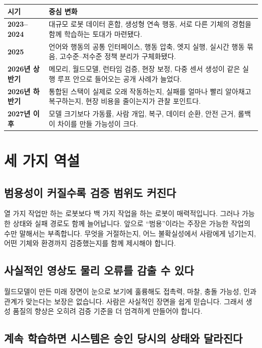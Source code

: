 \documentclass[11pt,openany]{book}
\begin{document}
\begin{center}
\begin{tabularx}{\textwidth}{>{\sffamily\bfseries\color{deepblue}}p{}X}
\toprule
시기 & 중심 변화 \\
\midrule
2023--2024 & 대규모 로봇 데이터 혼합, 생성형 연속 행동, 서로 다른 기체의 경험을 함께 학습하는 토대가 마련됐다. \\
2025 & 언어와 행동의 공통 인터페이스, 행동 압축, 엣지 실행, 실시간 행동 묶음, 고수준--저수준 정책 분리가 구체화됐다. \\
2026년 상반기 & 메모리, 월드모델, 런타임 검증, 현장 보정, 다중 센서 생성이 같은 실행 루프 안으로 들어오는 공개 사례가 늘었다. \\
2026년 하반기 & 통합된 스택이 실제로 오래 작동하는지, 실패를 얼마나 빨리 알아채고 복구하는지, 현장 비용을 줄이는지가 관찰 포인트다. \\
2027년 이후 & 모델 크기보다 가동률, 사람 개입, 복구, 데이터 순환, 안전 근거, 롤백이 차이를 만들 가능성이 크다. \\
\bottomrule
\end{tabularx}
\end{center}

\section{세 가지 역설}

\subsection{범용성이 커질수록 검증 범위도 커진다}

열 가지 작업만 하는 로봇보다 백 가지 작업을 하는 로봇이 매력적입니다. 그러나 가능한 상태와 실패 경로도 함께 늘어납니다. 앞으로 ``범용''이라는 주장은 가능한 작업의 수만 말해서는 부족합니다. 무엇을 거절하는지, 어느 불확실성에서 사람에게 넘기는지, 어떤 기체와 환경까지 검증했는지를 함께 제시해야 합니다.

\subsection{사실적인 영상도 물리 오류를 감출 수 있다}

월드모델이 만든 미래 장면이 눈으로 보기에 훌륭해도 접촉력, 마찰, 충돌 가능성, 인과 관계가 맞는다는 보장은 없습니다. 사람은 사실적인 장면을 쉽게 믿습니다. 그래서 생성 품질의 향상은 오히려 검증 기준을 더 엄격하게 만들어야 합니다.

\subsection{계속 학습하면 시스템은 승인 당시의 상태와 달라진다}
\end{document}
